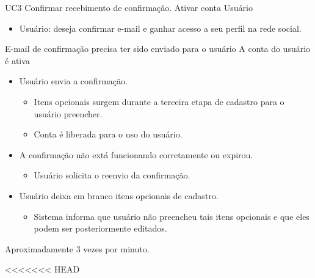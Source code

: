 
\casoDeUso
{UC3}
{Confirmar recebimento de confirmação. Ativar conta}
{Usuário}
{
\begin{itemize}
	\item Usuário: deseja confirmar e-mail e ganhar acesso a seu perfil na rede social.
\end{itemize}

}
{E-mail de confirmação precisa ter sido enviado para o usuário}
{A conta do usuário é ativa}
{
\begin{itemize}
	\item Usuário envia a confirmação.
	\begin{itemize}		
		\item Itens opcionais surgem durante a terceira etapa de cadastro para o usuário preencher.
		
		\item Conta é liberada para o uso do usuário.
	\end{itemize}	 
\end{itemize}
}
{
\begin{itemize}
	\item A confirmação não extá funcionando corretamente ou expirou.
	\begin{itemize}
		\item Usuário solicita o reenvio da confirmação.
	\end{itemize}
	\item Usuário deixa em branco itens opcionais de cadastro.
	\begin{itemize}
		\item Sistema informa que usuário não preencheu tais itens opcionais e que eles podem ser posteriormente editados.
	\end{itemize}
\end{itemize}
}
{Aproximadamente 3 vezes por minuto.}
{

}

<<<<<<< HEAD

